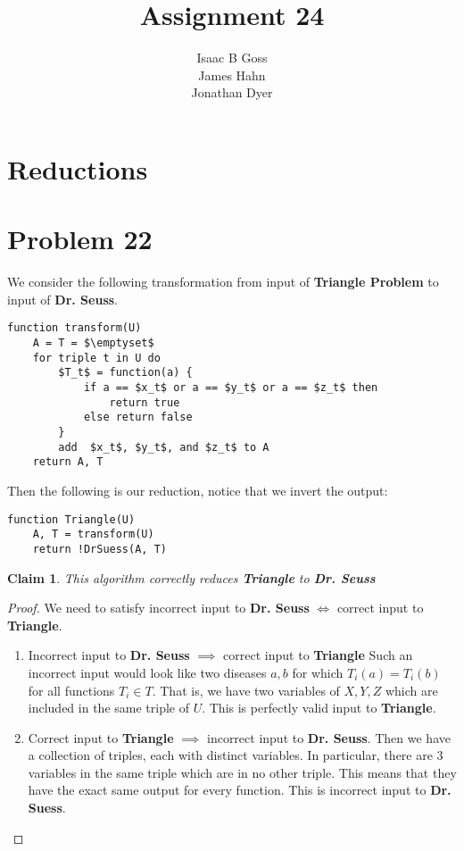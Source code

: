 \documentclass{article}
\author{Isaac B Goss\\ James Hahn\\ Jonathan Dyer}
\title{Assignment 24}
\newtheorem{thm}{Claim}
\providecommand{\prob}[1]{\section*{Problem #1}}
\begin{document}
\maketitle

\section*{Reductions}
\prob{22}
We consider the following transformation from input of \textbf{Triangle Problem} to input of \textbf{Dr. Seuss}.
\begin{lstlisting}
function transform(U)
    A = T = $\emptyset$
    for triple t in U do
        $T_t$ = function(a) {
            if a == $x_t$ or a == $y_t$ or a == $z_t$ then
                return true
            else return false
        }
        add  $x_t$, $y_t$, and $z_t$ to A
    return A, T
\end{lstlisting}

Then the following is our reduction, notice that we invert the output:
\begin{lstlisting}
function Triangle(U)
    A, T = transform(U)
    return !DrSuess(A, T)
\end{lstlisting}

\begin{thm}
    This algorithm correctly reduces \textbf{Triangle} to \textbf{Dr. Seuss}
\end{thm}
\begin{proof} We need to satisfy incorrect input to  \textbf{Dr. Seuss} $\iff$ correct input to \textbf{Triangle}.

    \begin{enumerate}
        \item Incorrect input to \textbf{Dr. Seuss} $\implies$ correct input to \textbf{Triangle}
        Such an incorrect input would look like two diseases $a, b$ for which $T_i(a) = T_i(b)$ for all functions $T_i \in T$.
        That is, we have two variables of $X,Y,Z$ which are included in the same triple of $U$.
        This is perfectly valid input to \textbf{Triangle}.

        \item Correct input to \textbf{Triangle} $\implies$ incorrect input to \textbf{Dr. Seuss}.
        Then we have a collection of triples, each with distinct variables.
        In particular, there are 3 variables in the same triple which are in no other triple.
        This means that they have the exact same output for every function.
        This is incorrect input to \textbf{Dr. Suess}.
    \end{enumerate}
\end{proof}
\end{document}
